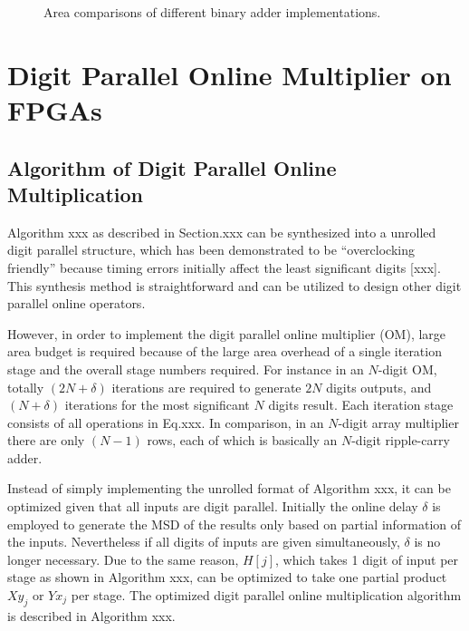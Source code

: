\documentclass[conference]{IEEEtran}
\begin{document}
\begin{figure}[tbp]
{\begin{minipage}{0.45\textwidth}
    \vspace{1ex}
  \end{minipage}
  }
  \caption{Area comparisons of different binary adder implementations.}
  \label{Fig:AdderArea}
\end{figure}



\section{Digit Parallel Online Multiplier on FPGAs}\label{Sec:OM_FPGA}
\subsection{Algorithm of Digit Parallel Online Multiplication}
Algorithm xxx as described in Section.xxx can be synthesized into a unrolled digit parallel structure, which has been demonstrated to be ``overclocking friendly'' because timing errors initially affect the least significant digits [xxx]. This synthesis method is straightforward and can be utilized to design other digit parallel online operators. 

However, in order to implement the digit parallel online multiplier (OM), large area budget is required because of the large area overhead of a single iteration stage and the overall stage numbers required. For instance in an $N$-digit OM, totally $(2N+\delta)$ iterations are required to generate $2N$ digits outputs, and $(N+\delta)$ iterations for the most significant $N$ digits result. Each iteration stage consists of all operations in Eq.xxx. In comparison, in an $N$-digit array multiplier there are only $(N-1)$ rows, each of which is basically an $N$-digit ripple-carry adder. 

Instead of simply implementing the unrolled format of Algorithm xxx, it can be optimized given that all inputs are digit parallel. Initially the online delay $\delta$ is employed to generate the MSD of the results only based on partial information of the inputs. Nevertheless if all digits of inputs are given simultaneously, $\delta$ is no longer necessary. Due to the same reason, $H[j]$, which takes 1 digit of input per stage as shown in Algorithm xxx, can be optimized to take one partial product $Xy_j$ or $Yx_j$ per stage. The optimized digit parallel online multiplication algorithm is described in Algorithm xxx.
\end{document}

